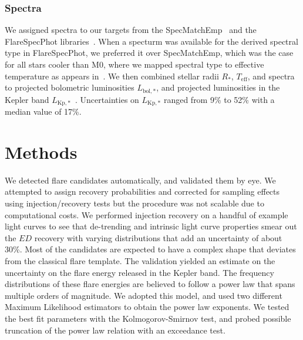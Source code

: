 \documentclass{aa}
\begin{document}
\subsubsection{Spectra}
We assigned spectra to our targets from the SpecMatchEmp~\citet{yee_specmatch_2017} and the FlareSpecPhot libraries~\citep{Schmidt2014b,Kirkpatrick2010, Burgasser2007,Burgasser2008,Burgasser2010, Burgasser2004,Cruz2004, Burgasser2006, Rayner2009, Doi2010, Filippazzo2015, Cruz2003, West2011, Bochanski2010,  Bochanski2007, Schmidt2010, Schmidt2015, Schmidt2014a, mann_how_2015}. When a specturm was available for the derived spectral type in FlareSpecPhot, we preferred it over SpecMatchEmp, which was the case for all stars cooler than M0, where we mapped spectral type to effective temperature as appears in~\citet{pecaut_intrinsic_2013}. We then combined stellar radii $R_*$, $T_\mathrm{eff}$, and spectra to projected bolometric luminosities $L_{\mathrm{bol,*}}$, and projected luminosities in the Kepler band $L_{\mathrm{Kp,*}}$~\citep{shibayama_superflares_2013,ilin_flares_2019}. Uncertainties on $L_{\mathrm{Kp,*}}$ ranged from 9\;\% to 52\;\% with a median value of 17\;\%.
\section{Methods}
We detected flare candidates automatically, and validated them by eye. We attempted to assign recovery probabilities and corrected for sampling effects using injection/recovery tests but the procedure was not scalable due to computational costs. We performed injection recovery on a handful of example light curves to see that de-trending and intrinsic light curve properties smear out the $ED$ recovery with varying distributions that add an uncertainty of about 30\%. Most of the candidates are expected to have a complex shape that deviates from the classical flare template. The validation yielded an estimate on the uncertainty on the flare energy released in the Kepler band. The frequency distributions of these flare energies are believed to follow a power law that spans multiple orders of magnitude. We adopted this model, and used two different Maximum Likelihood estimators to obtain the power law exponents. We tested the best fit parameters with the Kolmogorov-Smirnov test, and probed possible truncation of the power law relation with an exceedance test.
\end{document}
